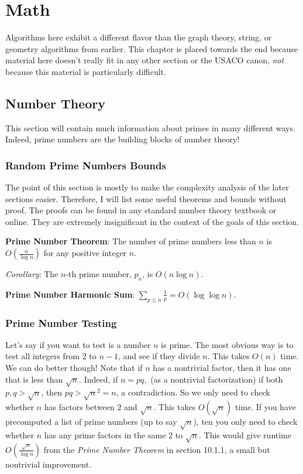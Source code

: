 \chapter{Math}

Algorithms here exhibit a different flavor than the graph theory, string, or geometry algorithms from earlier. This chapter is placed towards the end because material here doesn't really fit in any other section or the USACO canon, \textit{not} because this material is particularly difficult.

\section{Number Theory}

This section will contain much information about primes in many different ways. Indeed, prime numbers are the building blocks of number theory!

\subsection{Random Prime Numbers Bounds}

The point of this section is mostly to make the complexity analysis of the later sections easier. Therefore, I will list some useful theorems and bounds without proof. The proofs can be found in any standard number theory textbook or online. They are extremely insignificant in the context of the goals of this section.

\textbf{Prime Number Theorem}: The number of prime numbers less than $n$ is $O(\frac{n}{\log n})$ for any positive integer $n.$

\emph{Corollary}: The $n$-th prime number, $p_n$, is $O(n \log n).$

\textbf{Prime Number Harmonic Sum}: $\sum_{p \le n} \frac{1}{p} = O(\log \log n).$

\subsection{Prime Number Testing}

Let's say if you want to test is a number $n$ is prime. The most obvious way is to test all integers from $2$ to $n-1$, and see if they divide $n$. This takes $O(n)$ time. We can do better though! Note that if $n$ has a nontrivial factor, then it has one that is less than $\sqrt{n}.$ Indeed, if $n = pq,$ (as a nontrivial factorization) if both $p, q > \sqrt{n}$, then $pq > \sqrt{n}^2 = n$, a contradiction. So we only need to check whether $n$ has factors between $2$ and $\sqrt{n}.$ This takes $O(\sqrt{n})$ time. If you have precomputed a list of prime numbers (up to say $\sqrt{n}$), ten you only need to check whether $n$ has any prime factors in the same $2$ to $\sqrt{n}.$ This would give runtime $O(\frac{\sqrt{n}}{\log n})$ from the \emph{Prime Number Theorem} in section 10.1.1, a small but nontrivial improvement.

